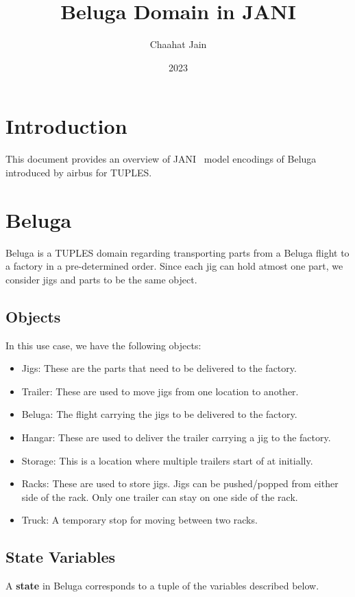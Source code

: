 \documentclass{article}
\title{Beluga Domain in JANI}
\author{Chaahat Jain}
\date{2023}
\begin{document}
\maketitle

\tableofcontents

\section{Introduction}
This document provides an overview of JANI~\cite{budde:etal:tacas-17} model encodings of Beluga introduced by airbus for TUPLES.

\section{Beluga}

Beluga is a TUPLES domain regarding transporting parts from a Beluga flight to a factory in a pre-determined order.
Since each jig can hold atmost one part, we consider jigs and parts to be the same object.

\subsection{Objects}
In this use case, we have the following objects:
\begin{itemize}
    \item Jigs: These are the parts that need to be delivered to the factory.
    \item Trailer: These are used to move jigs from one location to another.
    \item Beluga: The flight carrying the jigs to be delivered to the factory.
    \item Hangar: These are used to deliver the trailer carrying a jig to the factory.
    \item Storage: This is a location where multiple trailers start of at initially.
    \item Racks: These are used to store jigs. Jigs can be pushed/popped from either side of the rack. Only one trailer can stay on one side of the rack.
    \item Truck: A temporary stop for moving between two racks.
\end{itemize}

\subsection{State Variables}
A \textbf{state} in Beluga corresponds to a tuple of the variables described below.\\
\end{document}
